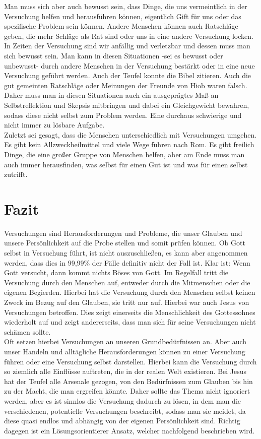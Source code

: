 Man muss sich aber auch bewusst sein, dass Dinge, die uns vermeintlich in der Versuchung helfen und herausführen
können, eigentlich Gift für uns oder das spezifische Problem sein können. Andere Menschen können auch Ratschläge geben,
die mehr Schläge als Rat sind oder uns in eine andere Versuchung locken. In Zeiten der Versuchung sind wir anfällig und
verletzbar und dessen muss man sich bewusst sein. Man kann in diesen Situationen -sei es bewusst oder unbewusst- durch
andere Menschen in der Versuchung bestärkt oder in eine neue Versuchung geführt werden. Auch der Teufel konnte die
Bibel zitieren. Auch die gut gemeinten Ratschläge oder Meinungen der Freunde von Hiob waren falsch. Daher muss man in
diesen Situationen auch ein ausgeprägtes Maß an Selbstreflektion und Skepsis mitbringen und dabei ein Gleichgewicht
bewahren, sodass diese nicht selbst zum Problem werden. Eine durchaus schwierige und nicht immer zu lösbare Aufgabe. \\

Zuletzt sei gesagt, dass die Menschen unterschiedlich mit Versuchungen umgehen. Es gibt kein Allzweckheilmittel und
viele Wege führen nach Rom. Es gibt freilich Dinge, die eine großer Gruppe von Menschen helfen, aber am Ende muss man
auch immer herausfinden, was selbst für einen Gut ist und was für einen selbst zutrifft.

\pagebreak
\section{Fazit}
Versuchungen sind Herausforderungen und Probleme, die unser Glauben und unsere Persönlichkeit auf die Probe stellen und
somit prüfen können. Ob Gott selbst in Versuchung führt, ist nicht auszuschließen, es kann aber angenommen werden, dass
dies in 99,99\% der Fälle definitiv nicht der Fall ist. Klar ist: Wenn Gott versucht, dann kommt nichts Böses von Gott.
Im Regelfall tritt die Versuchung durch den Menschen auf, entweder durch die Mitmenschen oder die eigenen Begierden.
Hierbei hat die Versuchung durch den Menschen selbst keinen Zweck im Bezug auf den Glauben, sie tritt nur auf. Hierbei
war auch Jesus von Versuchungen betroffen. Dies zeigt einerseits die Menschlichkeit des Gottessohnes wiederholt auf und
zeigt andererseits, dass man sich für seine Versuchungen nicht schämen sollte. \\

Oft setzen hierbei Versuchungen an unseren Grundbedürfnissen an. Aber auch unser Handeln und alltägliche
Herausforderungen können zu einer Versuchung führen oder eine Versuchung selbst darstellen. Hierbei kann die Versuchung
durch so ziemlich alle Einflüsse auftreten, die in der realen Welt existieren. Bei Jesus hat der Teufel alle Arsenale
gezogen, von den Bedürfnissen zum Glauben bis hin zu der Macht, die man ergreifen könnte. Daher sollte das Thema nicht
ignoriert werden, aber es ist sinnlos die Versuchung dadurch zu lösen, in dem man die verschiedenen, potentielle
Versuchungen beschreibt, sodass man sie meidet, da diese quasi endlos und abhängig von der eigenen Persönlichkeit sind.
Richtig dagegen ist ein Lösungsorientierer Ansatz, welcher nachfolgend beschrieben wird. \\

